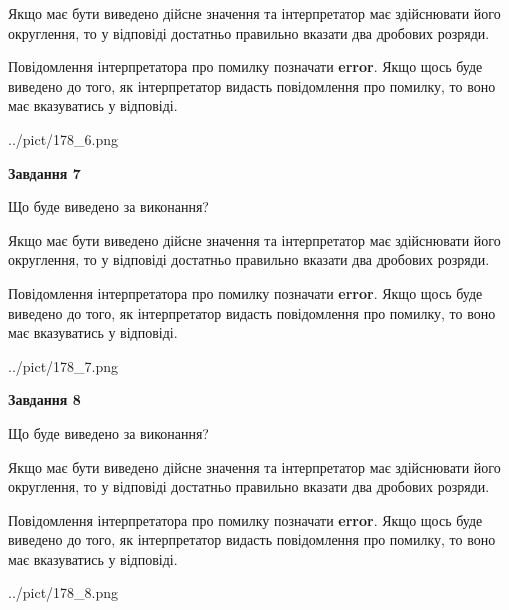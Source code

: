 \documentclass[12pt, ukrainian]{article}
\begin{document}
{\begin {Large}
Якщо має бути виведено дійсне значення та інтерпретатор має здійснювати його округлення, 
то у відповіді достатньо правильно вказати два дробових розряди.

Повідомлення інтерпретатора про помилку позначати \textbf{error}.
Якщо щось буде виведено до того, як інтерпретатор видасть повідомлення про помилку, 
то воно має вказуватись у відповіді. \par

\begin{center}
	{../pict/178_6.png}
\end{center}
\newpage

{\begin {center}\textbf{Завдання 7}\end {center}}\par
Що буде виведено за виконання? \par

Якщо має бути виведено дійсне значення та інтерпретатор має здійснювати його округлення, 
то у відповіді достатньо правильно вказати два дробових розряди.

Повідомлення інтерпретатора про помилку позначати \textbf{error}.
Якщо щось буде виведено до того, як інтерпретатор видасть повідомлення про помилку, 
то воно має вказуватись у відповіді. \par

\begin{center}
	{../pict/178_7.png}
\end{center}
\newpage

{\begin {center}\textbf{Завдання 8}\end {center}}\par
Що буде виведено за виконання? \par

Якщо має бути виведено дійсне значення та інтерпретатор має здійснювати його округлення, 
то у відповіді достатньо правильно вказати два дробових розряди.

Повідомлення інтерпретатора про помилку позначати \textbf{error}.
Якщо щось буде виведено до того, як інтерпретатор видасть повідомлення про помилку, 
то воно має вказуватись у відповіді. \par

\begin{center}
	{../pict/178_8.png}
\end{center}
\newpage


\end{Large}}
\end{document}
